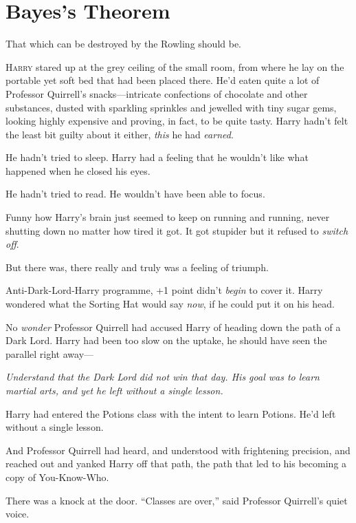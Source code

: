 \chapter{Bayes’s Theorem}

\begin{chapterOpeningAuthorNote}
That which can be destroyed by the Rowling should be.
\end{chapterOpeningAuthorNote}

\lettrine{H}{arry} stared up at the grey ceiling of the small room, from where he lay on the portable yet soft bed that had been placed there. He’d eaten quite a lot of Professor Quirrell’s snacks—intricate confections of chocolate and other substances, dusted with sparkling sprinkles and jewelled with tiny sugar gems, looking highly expensive and proving, in fact, to be quite tasty. Harry hadn’t felt the least bit guilty about it either, \emph{this} he had \emph{earned}.

He hadn’t tried to sleep. Harry had a feeling that he wouldn’t like what happened when he closed his eyes.

He hadn’t tried to read. He wouldn’t have been able to focus.

Funny how Harry’s brain just seemed to keep on running and running, never shutting down no matter how tired it got. It got stupider but it refused to \emph{switch off}.

But there was, there really and truly was a feeling of triumph.

Anti-Dark-Lord-Harry programme, +1 point didn’t \emph{begin} to cover it. Harry wondered what the Sorting Hat would say \emph{now}, if he could put it on his head.

No \emph{wonder} Professor Quirrell had accused Harry of heading down the path of a Dark Lord. Harry had been too slow on the uptake, he should have seen the parallel right away—

\emph{Understand that the Dark Lord did not win that day. His goal was to learn martial arts, and yet he left without a single lesson.}

Harry had entered the Potions class with the intent to learn Potions. He’d left without a single lesson.

And Professor Quirrell had heard, and understood with frightening precision, and reached out and yanked Harry off that path, the path that led to his becoming a copy of You-Know-Who.

There was a knock at the door.
“Classes are over,” said Professor Quirrell’s quiet voice.

